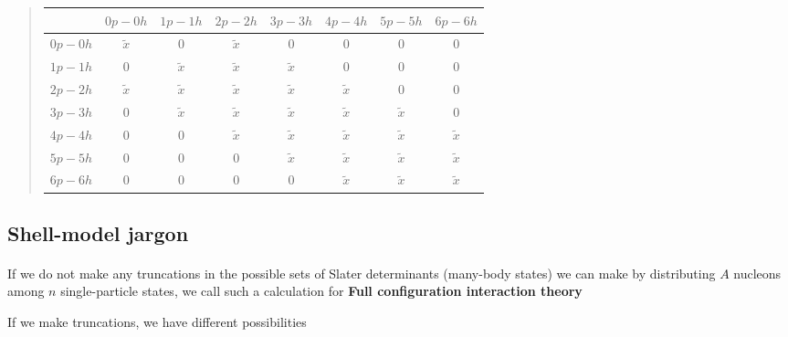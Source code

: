 \begin{quote}
\begin{tabular}{cccccccc}
\hline
\multicolumn{1}{c}{  } & \multicolumn{1}{c}{ $0p-0h$ } & \multicolumn{1}{c}{ $1p-1h$ } & \multicolumn{1}{c}{ $2p-2h$ } & \multicolumn{1}{c}{ $3p-3h$ } & \multicolumn{1}{c}{ $4p-4h$ } & \multicolumn{1}{c}{ $5p-5h$ } & \multicolumn{1}{c}{ $6p-6h$ } \\
\hline
$0p-0h$ & $\tilde{x}$ & 0           & $\tilde{x}$ & 0           & 0           & 0           & 0           \\
$1p-1h$ & 0           & $\tilde{x}$ & $\tilde{x}$ & $\tilde{x}$ & 0           & 0           & 0           \\
$2p-2h$ & $\tilde{x}$ & $\tilde{x}$ & $\tilde{x}$ & $\tilde{x}$ & $\tilde{x}$ & 0           & 0           \\
$3p-3h$ & 0           & $\tilde{x}$ & $\tilde{x}$ & $\tilde{x}$ & $\tilde{x}$ & $\tilde{x}$ & 0           \\
$4p-4h$ & 0           & 0           & $\tilde{x}$ & $\tilde{x}$ & $\tilde{x}$ & $\tilde{x}$ & $\tilde{x}$ \\
$5p-5h$ & 0           & 0           & 0           & $\tilde{x}$ & $\tilde{x}$ & $\tilde{x}$ & $\tilde{x}$ \\
$6p-6h$ & 0           & 0           & 0           & 0           & $\tilde{x}$ & $\tilde{x}$ & $\tilde{x}$ \\
\hline
\end{tabular}
\end{quote}

\noindent



\subsection*{Shell-model jargon}

\paragraph{}
If we do not make any truncations in the possible sets of Slater determinants (many-body states) we can make by distributing $A$ nucleons among $n$ single-particle states, we call such a calculation for \textbf{Full configuration interaction theory}

If we make truncations, we have different possibilities

